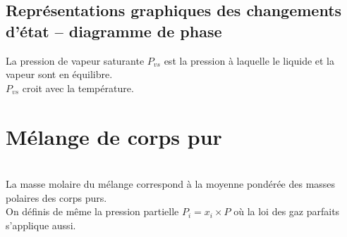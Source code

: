 \documentclass[13pt, twoside, a4paper, french]{report}
\begin{document}
            \subsection{Représentations graphiques des changements d’état – diagramme de phase}\label{subsec:representations-graphiques-des-changements-detat--diagramme-de-phase}

                \resizebox{.35\textwidth}{!}{
                
            }

        \vspace{-7pt}
        La pression de vapeur saturante $P_{vs}$ est la pression à laquelle le liquide et la vapeur sont en équilibre.\\
        $P_{vs}$ croit avec la température.

        \section{Mélange de corps pur}\label{sec:melange-de-corps-pur}

            \vspace{5pt}\\
            La masse molaire du mélange correspond à la moyenne pondérée des masses polaires des corps purs.\\
            On définis de même la pression partielle $P_i = x_i \times P$ où la loi des gaz parfaits s'applique aussi.
\end{document}
